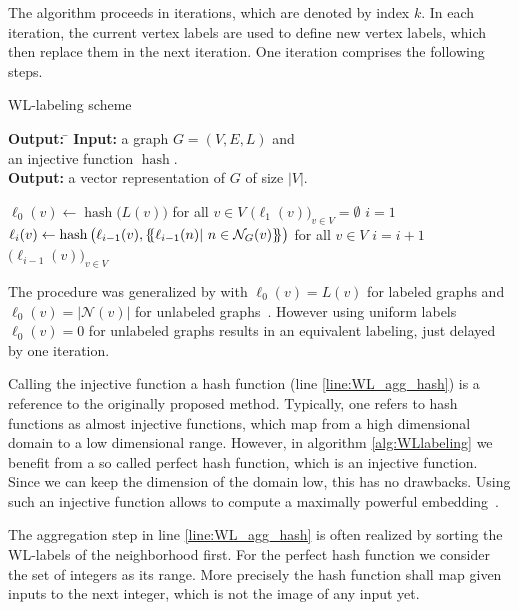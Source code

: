 		The algorithm proceeds in iterations, which are denoted by index $k$.
		In each iteration, the current vertex labels are used to define new vertex labels, which then replace them in the next iteration. 
		One iteration comprises the following steps.
		\begin{algorithm}[H]
			\caption{WL-labeling scheme} \label{alg:WLlabeling} 
			\begin{tabbing}
				\textbf{Output:} \= \kill
				\textbf{Input:} \>a graph $G=(V, E, L)$ and\\
				\>an injective function $\operatorname{hash}$.\\		
				\textbf{Output:} \>a vector representation of $G$ of size $|V|$.
			\end{tabbing}	
			\begin{algorithmic}[1]
				\State $\ell_0(v) \leftarrow \operatorname{hash}\big(L(v)\big)$ for all $v\in V$
				\State $\big(\ell_{1}(v)\big)_{v\in V} = \emptyset$
				\State $i=1$
					\State $\ell_{i}(v) \leftarrow \operatorname{hash}\big(\ell_{i-1}(v), \mset{\ell_{i-1}(n)| \ n\in\mathcal{N}_G(v)} \big)$ \qquad for all $v\in V$ \label{line:WL_agg_hash}
					\State $i=i+1$
				\EndWhile		
				\State\Return $\big(\ell_{i-1}(v)\big)_{v\in V}$
			\end{algorithmic}
		\end{algorithm}
		The procedure was generalized by \cite{2019_Xu_CONF} with $\ell_0(v) = L(v)$ for labeled graphs and $\ell_0(v) = |\mathcal{N}(v)|$ for unlabeled graphs~\cite{2009_Shervashidze_NIPS}.
		However using uniform labels $\ell_0(v) = 0$ for unlabeled graphs results in an equivalent labeling, just delayed by one iteration.
		
		Calling the injective function a hash function (line \ref{line:WL_agg_hash}) is a reference to the originally proposed method.
		Typically, one refers to hash functions as almost injective functions, which map from a high dimensional domain to a low dimensional range.
		However, in algorithm \ref{alg:WLlabeling} we benefit from a so called perfect hash function, which is an injective function.
		Since we can keep the dimension of the domain low, this has no drawbacks.
		Using such an injective function allows to compute a  maximally powerful embedding~\cite{2019_Xu_CONF}.
		
		The aggregation step in line \ref{line:WL_agg_hash} is often realized by sorting the WL-labels of the neighborhood first.
		For the perfect hash function we consider the set of integers as its range.
		More precisely the hash function shall map given inputs to the next integer, which is not the image of any input yet.
		
